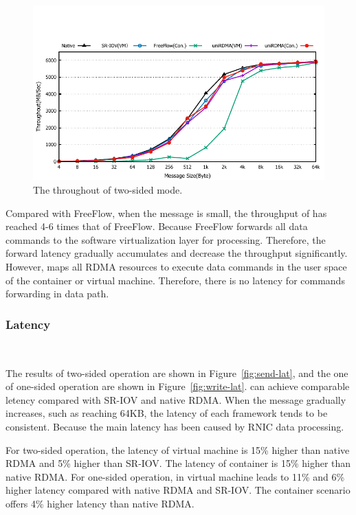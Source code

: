 \begin{figure}[!ht]
	\centering
	\includegraphics[width=1.0\linewidth]{images/send-bw.pdf}
	\caption{The throughout of two-sided mode.}
	\label{fig:send-bw}
\end{figure}

Compared with FreeFlow, when the message is small, the throughput of \sys has reached 4-6 times that of FreeFlow. Because FreeFlow forwards all data commands to the software virtualization layer for processing. Therefore, the forward latency gradually accumulates and decrease the throughput significantly. However, \sys maps all RDMA resources to execute data commands in the user space of the container or virtual machine. Therefore, there is no latency for commands forwarding in data path.





\subsubsection{\textbf{Latency}}
\
\noindent

The results of two-sided operation are shown in Figure~\ref{fig:send-lat}, and the one of one-sided operation are shown in Figure~\ref{fig:write-lat}. \sys can achieve comparable letency compared with SR-IOV and native RDMA. When the message gradually increases, such as reaching 64KB, the latency of each framework tends to be consistent. Because the main latency has been caused by RNIC data processing.

For two-sided operation, the latency of virtual machine is 15\% higher than native RDMA and 5\% higher than SR-IOV. The latency of container is 15\% higher than native RDMA. For one-sided operation, \sys in virtual machine leads to 11\% and 6\% higher latency compared with native RDMA and SR-IOV. The container scenario offers 4\% higher latency than native RDMA. 

